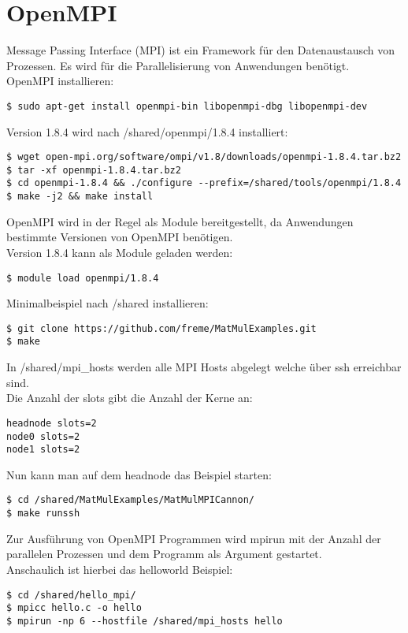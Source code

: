 \chapter{OpenMPI}
Message Passing Interface (MPI) ist ein Framework für den Datenaustausch von Prozessen. Es wird für die Parallelisierung von Anwendungen benötigt.\\
OpenMPI installieren:
\begin{lstlisting}[style=Bash]
$ sudo apt-get install openmpi-bin libopenmpi-dbg libopenmpi-dev
\end{lstlisting}
Version 1.8.4 wird nach /shared/openmpi/1.8.4 installiert:
\begin{lstlisting}[style=Bash]
$ wget open-mpi.org/software/ompi/v1.8/downloads/openmpi-1.8.4.tar.bz2
$ tar -xf openmpi-1.8.4.tar.bz2
$ cd openmpi-1.8.4 && ./configure --prefix=/shared/tools/openmpi/1.8.4
$ make -j2 && make install
\end{lstlisting}
OpenMPI wird in der Regel als Module bereitgestellt, da Anwendungen bestimmte Versionen von OpenMPI benötigen.\\
Version 1.8.4 kann als Module geladen werden:
\begin{lstlisting}[style=Bash]
$ module load openmpi/1.8.4
\end{lstlisting}
Minimalbeispiel nach /shared installieren:
\begin{lstlisting}[style=Bash]
$ git clone https://github.com/freme/MatMulExamples.git
$ make
\end{lstlisting}
In /shared/mpi\_hosts werden alle MPI Hosts abgelegt welche über ssh erreichbar sind.\\
Die Anzahl der slots gibt die Anzahl der Kerne an:
\begin{lstlisting}[style=Bash]
headnode slots=2
node0 slots=2
node1 slots=2
\end{lstlisting}
Nun kann man auf dem headnode das Beispiel starten:
\begin{lstlisting}[style=Bash]
$ cd /shared/MatMulExamples/MatMulMPICannon/
$ make runssh
\end{lstlisting}
Zur Ausführung von OpenMPI Programmen wird mpirun mit der Anzahl der parallelen Prozessen und dem Programm als Argument gestartet.\\
Anschaulich ist hierbei das helloworld Beispiel:
\begin{lstlisting}[style=Bash]
$ cd /shared/hello_mpi/
$ mpicc hello.c -o hello 
$ mpirun -np 6 --hostfile /shared/mpi_hosts hello
\end{lstlisting}
